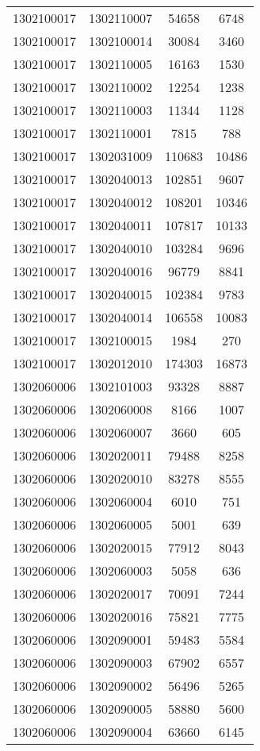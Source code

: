 \begin{longtable}[h]{llcc}
		1302100017 & 1302110007 & 54658 & 6748\\
		1302100017 & 1302100014 & 30084 & 3460\\
		1302100017 & 1302110005 & 16163 & 1530\\
		1302100017 & 1302110002 & 12254 & 1238\\
		1302100017 & 1302110003 & 11344 & 1128\\
		1302100017 & 1302110001 & 7815 & 788\\
		1302100017 & 1302031009 & 110683 & 10486\\
		1302100017 & 1302040013 & 102851 & 9607\\
		1302100017 & 1302040012 & 108201 & 10346\\
		1302100017 & 1302040011 & 107817 & 10133\\
		1302100017 & 1302040010 & 103284 & 9696\\
		1302100017 & 1302040016 & 96779 & 8841\\
		1302100017 & 1302040015 & 102384 & 9783\\
		1302100017 & 1302040014 & 106558 & 10083\\
		1302100017 & 1302100015 & 1984 & 270\\
		1302100017 & 1302012010 & 174303 & 16873\\
		1302060006 & 1302101003 & 93328 & 8887\\
		1302060006 & 1302060008 & 8166 & 1007\\
		1302060006 & 1302060007 & 3660 & 605\\
		1302060006 & 1302020011 & 79488 & 8258\\
		1302060006 & 1302020010 & 83278 & 8555\\
		1302060006 & 1302060004 & 6010 & 751\\
		1302060006 & 1302060005 & 5001 & 639\\
		1302060006 & 1302020015 & 77912 & 8043\\
		1302060006 & 1302060003 & 5058 & 636\\
		1302060006 & 1302020017 & 70091 & 7244\\
		1302060006 & 1302020016 & 75821 & 7775\\
		1302060006 & 1302090001 & 59483 & 5584\\
		1302060006 & 1302090003 & 67902 & 6557\\
		1302060006 & 1302090002 & 56496 & 5265\\
		1302060006 & 1302090005 & 58880 & 5600\\
		1302060006 & 1302090004 & 63660 & 6145\\

\end{longtable}
